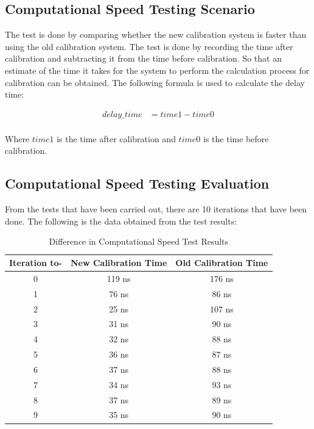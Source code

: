 \subsection{Computational Speed Testing Scenario}
\label{sec:analisispengujian}

The test is done by comparing whether the new calibration system is faster than using the old calibration system. The test is done by recording the time after calibration and subtracting it from the time before calibration. So that an estimate of the time it takes for the system to perform the calculation process for calibration can be obtained. The following formula is used to calculate the delay time:

\begin{equation}
  \begin{aligned}
    delay\_time &= time1 - time0 \\ 
  \end{aligned}
\end{equation}

Where $time1$ is the time after calibration and $time0$ is the time before calibration.

\subsection{Computational Speed Testing Evaluation}
\label{sec:analisispengujian}

From the tests that have been carried out, there are 10 iterations that have been done. The following is the data obtained from the test results:

\begin{table}[htpb]
  \caption{Difference in Computational Speed Test Results}
\begin{center}

\begin{tabular}{|c|c|c|}
  \hline
  \rowcolor[HTML]{C0C0C0}
  \textbf{Iteration to-} & \textbf{New Calibration Time} & \textbf{Old Calibration Time} \\
  \hline
  0            & 119 ns                & 176 ns            \\
  1           & 76 ns                & 86 ns            \\
  2           & 25 ns                & 107 ns            \\
  3           & 31 ns                & 90 ns           \\
  4           & 32 ns                & 88 ns           \\
  5           & 36 ns                & 87 ns           \\
  6           & 37 ns                & 88 ns           \\
  7           & 34 ns                & 93 ns           \\
  8           & 37 ns                & 89 ns           \\
  9           & 35 ns                & 90 ns           \\
  \hline
\end{tabular}
\end{center}
\end{table}

